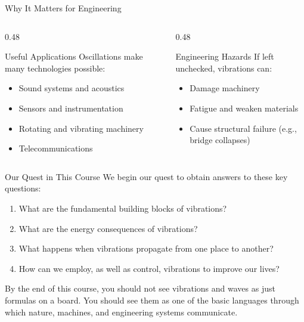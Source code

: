 \documentclass[aspectratio=169,xcolor=dvipsnames]{beamer}
\begin{document}
\begin{frame}{Why It Matters for Engineering}
  \begin{columns}[T]
    \begin{column}{0.48\textwidth}
      \begin{umlaw}{Useful Applications}
        Oscillations make many technologies possible:
        \begin{itemize}
          \item Sound systems and acoustics
          \item Sensors and instrumentation
          \item Rotating and vibrating machinery
          \item Telecommunications
        \end{itemize}
      \end{umlaw}
    \end{column}
    \begin{column}{0.48\textwidth}
      \begin{umlaw}{Engineering Hazards}
        If left unchecked, vibrations can:
        \begin{itemize}
          \item Damage machinery
          \item Fatigue and weaken materials
          \item Cause structural failure (e.g., bridge collapses)
        \end{itemize}
      \end{umlaw}
    \end{column}
  \end{columns}
\end{frame}

\begin{frame}{Our Quest in This Course}
  We begin our quest to obtain answers to these key questions:
  \begin{enumerate}
    \item What are the fundamental building blocks of vibrations?
    \item What are the energy consequences of vibrations?
    \item What happens when vibrations propagate from one place to another?
    \item How can we employ, as well as control, vibrations to improve our lives?
  \end{enumerate}

  \vspace{0.8em}
  \begin{umnote}
    By the end of this course, you should not see vibrations and waves as just formulas on a board. You should see them as one of the basic languages through which nature, machines, and engineering systems communicate.
  \end{umnote}
\end{frame}
\end{document}
